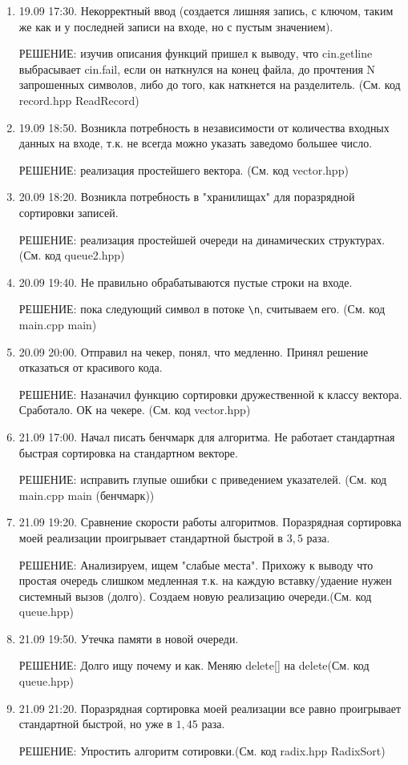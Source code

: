 \documentclass[12pt]{article}
\begin{document}
\begin{enumerate}
\item 19.09 17:30. Некорректный ввод (создается лишняя запись, с ключом, таким же как и у последней записи на входе, но с пустым значением).

РЕШЕНИЕ: изучив описания функций пришел к выводу, что cin.getline выбрасывает cin.fail, если он наткнулся на конец файла, до прочтения N запрошенных символов, либо до того, как наткнется на разделитель.
(См. код record.hpp ReadRecord)

\item 19.09 18:50. Возникла потребность в независимости от количества входных данных на входе, т.к. не всегда можно указать заведомо большее число.

РЕШЕНИЕ: реализация простейшего вектора. (См. код vector.hpp)

\item 20.09 18:20. Возникла потребность в "хранилищах" для поразрядной сортировки записей.

РЕШЕНИЕ: реализация простейшей очереди на динамических структурах. (См. код queue2.hpp)

\item 20.09 19:40. Не правильно обрабатываются пустые строки на входе.

РЕШЕНИЕ: пока следующий символ в потоке \verb|\n|, считываем его. 
(См. код main.cpp main)

\item 20.09 20:00. Отправил на чекер, понял, что медленно. Принял решение отказаться от красивого кода. 

РЕШЕНИЕ: Назаначил функцию сортировки дружественной к классу вектора. Сработало. ОК на чекере. (См. код vector.hpp)

\item 21.09 17:00. Начал писать бенчмарк для алгоритма. Не работает стандартная быстрая сортировка на стандартном векторе. 

РЕШЕНИЕ: исправить глупые ошибки с приведением указателей. (См. код main.cpp main (бенчмарк))

\item 21.09 19:20. Сравнение скорости работы алгоритмов. Поразрядная сортировка моей реализации проигрывает стандартной быстрой в $3,5$ раза. 

РЕШЕНИЕ: Анализируем, ищем "слабые места". Прихожу к выводу что простая  очередь слишком медленная т.к. на каждую вставку/удаение нужен системный вызов (долго). Создаем новую реализацию очереди.(См. код queue.hpp)

\item 21.09 19:50. Утечка памяти в новой очереди.

РЕШЕНИЕ: Долго ищу почему и как. Меняю delete[] на delete(См. код queue.hpp)

\item 21.09 21:20. Поразрядная сортировка моей реализации все равно проигрывает стандартной быстрой, но уже в $1,45$ раза.

РЕШЕНИЕ: Упростить алгоритм сотировки.(См. код radix.hpp RadixSort)

\end{enumerate}
\end{document}
